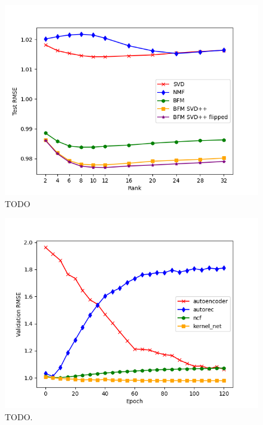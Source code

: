 \documentclass[10pt,conference,compsocconf]{IEEEtran}
\begin{document}
    \begin{figure}
        \includegraphics[width=\columnwidth]{figures/rank.png}
        \caption{TODO}
        \label{fig:rank}
    \end{figure}

    \begin{figure}
        \includegraphics[width=\columnwidth]{figures/validation_plot.png}
        \caption{TODO.}
        \label{fig:validation}
    \end{figure}
\end{document}
